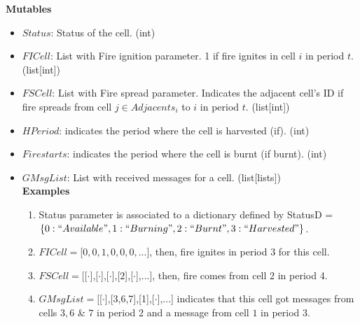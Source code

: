 \documentclass[11pt]{article}
\begin{document}
\begin{enumerate}
\begin{enumerate}
\begin{itemize}
 				
 			\end{itemize}
 			
 			\textbf{Mutables}
 			\begin{itemize} 
 					
 				\item $Status$: Status of the cell. \hfill (int) 
				\item $FICell$: List with Fire ignition parameter. 1 if fire ignites in cell $i$ in period $t$. \hfill (list[int]) 				
 				\item $FSCell$: List with Fire spread parameter. Indicates the adjacent cell's ID if fire spreads from cell $j \in Adjacents_i$ to $i$ in period $t$.  \hfill (list[int])
 				\item $HPeriod$: indicates the period where the cell is harvested (if). \hfill (int)
 				\item $Firestarts$: indicates the period where the cell is burnt (if burnt). \hfill (int)
 				\item $GMsgList$: List with received messages for a cell. \hfill (list[lists]) \\ 
 				
\newpage	
 				 \textbf{Examples}
 				 \begin{enumerate}
 					\item Status parameter is associated to a dictionary defined by StatusD = $\lbrace 0: ``Available", 1: ``Burning", 2: ``Burnt", 3: ``Harvested"\rbrace$.  
 					\item $FICell = $[$0,0,1,0,0,0,...$], then, fire ignites in period 3 for this cell. 
 					\item $FSCell = $[[$\cdot$],[$\cdot$],[$\cdot$],[$2$],[$\cdot$],...], then, fire comes from cell 2 in period 4. 
 				\item $GMsgList = $[[$\cdot$],[3,6,7],[1],[$\cdot$],...] indicates that this cell got messages from cells $3, 6$ \& $7$ in period 2 and a message from cell $1$ in period 3. \\
 				 \end{enumerate}
 				 

 				
 			\end{itemize} 
 			

\end{enumerate}
\end{enumerate}
\end{document}
